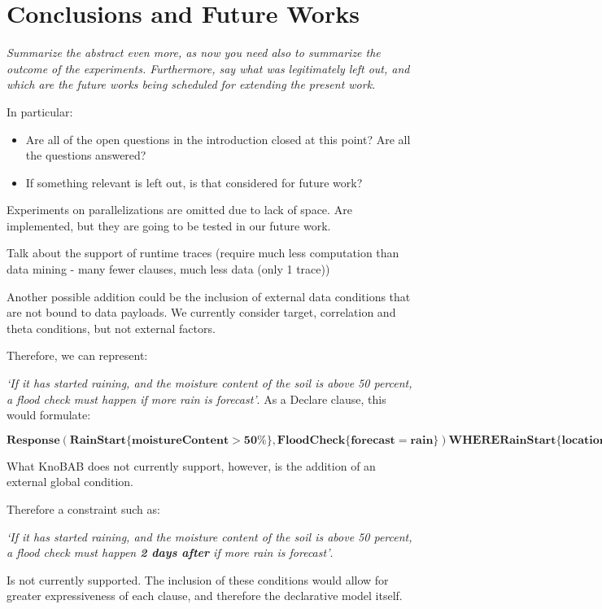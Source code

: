 \section{Conclusions and Future Works}
\textit{Summarize the abstract even more, as now you need also to summarize the outcome of the experiments. Furthermore, say what was legitimately left out, and which are the future works being scheduled for extending the present work.}

In particular:
\begin{itemize}
	\item Are all of the open questions in the introduction closed at this point? Are all the questions answered? 
	\item If something relevant is left out, is that considered for future work?
\end{itemize}

Experiments on parallelizations are omitted due to lack of space. Are implemented, but they are going to be tested in our future work.

Talk about the support of runtime traces (require much less computation than data mining - many fewer clauses, much less data (only 1 trace))

Another possible addition could be the inclusion of external data conditions that are not bound to data payloads. We currently consider target, correlation and theta conditions, but not external factors. 

Therefore, we can represent: 

\emph{`If it has started raining, and the moisture content of the soil is above 50 percent, a flood check must happen if more rain is forecast'}.  
As a Declare clause, this would formulate:

{\tiny$\mathbf{Response(RainStart \{moistureContent>50\%\}, FloodCheck\{forecast=rain\}) WHERE RainStart\{location\} = FloodCheck\{location\}}$}

What KnoBAB does not currently support, however, is the addition of an external global condition. 

Therefore a constraint such as:

\emph{`If it has started raining, and the moisture content of the soil is above 50 percent, a flood check must happen \textbf{2 days after} if more rain is forecast'}.  

Is not currently supported. The inclusion of these conditions would allow for greater expressiveness of each clause, and therefore the declarative model itself.